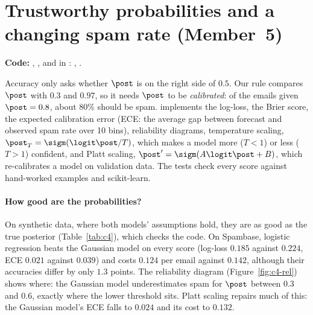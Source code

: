 \section{Trustworthy probabilities and a changing spam rate (Member~5)}
\label{sec:m5}
\textbf{Code:} , , and in :
, .

Accuracy only asks whether $\post$ is on the right side of $0.5$. Our rule compares $\post$ with
$0.3$ and $0.97$, so it needs $\post$ to be \emph{calibrated}: of the emails given $\post=0.8$, about
$80\%$ should be spam.  implements the log-loss, the Brier score, the expected
calibration error (ECE: the average gap between forecast and observed spam rate over 10 bins),
reliability diagrams, temperature scaling, $\post_T=\sigm(\logit\post/T)$, which makes a model more
($T<1$) or less ($T>1$) confident, and Platt scaling, $\post'=\sigm(A\logit\post+B)$, which
re-calibrates a model on validation data. The tests check every score against hand-worked examples and
scikit-learn.

\begin{table}[!htbp]
\centering\footnotesize\setlength{\tabcolsep}{3.5pt}

\caption{Forecast quality on test data (mean $\pm$ standard error, 20 splits). Accuracy uses the cut
$0.5$; Cost and Inspected are for the rule with inspection ($\cfp=10$, $\cfn=1$, $\ci=0.3$). Spambase
uses $\log(1+x)$ features. ``+ Platt'': re-calibrated on validation data.}
\label{tab:c4}
\end{table}

\paragraph{How good are the probabilities?}
On synthetic data, where both models' assumptions hold, they are as good as the true posterior
(Table~\ref{tab:c4}), which checks the code. On Spambase, logistic regression beats the Gaussian
model on every score (log-loss $0.185$ against $0.224$, ECE $0.021$ against $0.039$) and costs
$0.124$ per email against $0.142$, although their accuracies differ by only $1.3$ points. The
reliability diagram (Figure~\ref{fig:c4-rel}) shows where: the Gaussian model underestimates spam for
$\post$ between $0.3$ and $0.6$, exactly where the lower threshold sits. Platt scaling repairs much of
this: the Gaussian model's ECE falls to $0.024$ and its cost to $0.132$.

